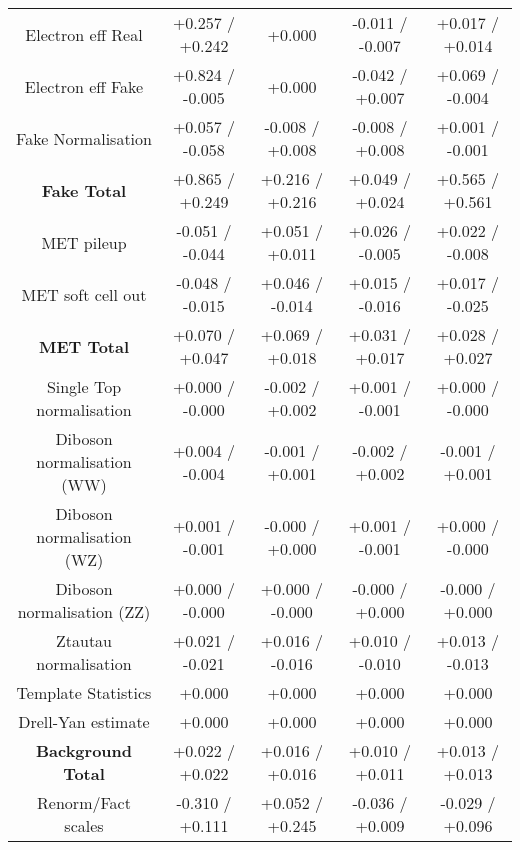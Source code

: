 \begin{table}[htbp]
\begin{center}
\begin{tabular}{|c|c|c|c|c|}
Electron eff Real                     &+0.257   / +0.242   & +0.000              & -0.011   / -0.007   & +0.017   / +0.014  \\
Electron eff Fake                     &+0.824   / -0.005   & +0.000              & -0.042   / +0.007   & +0.069   / -0.004  \\
Fake Normalisation                    &+0.057   / -0.058   & -0.008   / +0.008   & -0.008   / +0.008   & +0.001   / -0.001  \\
\hline
\textbf{Fake Total}                   &+0.865   / +0.249   & +0.216   / +0.216   & +0.049   / +0.024   & +0.565   / +0.561  \\
\hline
MET pileup                            &-0.051   / -0.044   & +0.051   / +0.011   & +0.026   / -0.005   & +0.022   / -0.008  \\
MET soft cell out                     &-0.048   / -0.015   & +0.046   / -0.014   & +0.015   / -0.016   & +0.017   / -0.025  \\
\hline
\textbf{MET Total}                    &+0.070   / +0.047   & +0.069   / +0.018   & +0.031   / +0.017   & +0.028   / +0.027  \\
\hline
Single Top normalisation              &+0.000   / -0.000   & -0.002   / +0.002   & +0.001   / -0.001   & +0.000   / -0.000  \\
Diboson normalisation (WW)            &+0.004   / -0.004   & -0.001   / +0.001   & -0.002   / +0.002   & -0.001   / +0.001  \\
Diboson normalisation (WZ)            &+0.001   / -0.001   & -0.000   / +0.000   & +0.001   / -0.001   & +0.000   / -0.000  \\
Diboson normalisation (ZZ)            &+0.000   / -0.000   & +0.000   / -0.000   & -0.000   / +0.000   & -0.000   / +0.000  \\
Ztautau normalisation                 &+0.021   / -0.021   & +0.016   / -0.016   & +0.010   / -0.010   & +0.013   / -0.013  \\
Template Statistics                   &+0.000              & +0.000              & +0.000              & +0.000             \\
Drell-Yan estimate                    &+0.000              & +0.000              & +0.000              & +0.000             \\
\hline
\textbf{Background Total}             &+0.022   / +0.022   & +0.016   / +0.016   & +0.010   / +0.011   & +0.013   / +0.013  \\
\hline
Renorm/Fact scales                    &-0.310   / +0.111   & +0.052   / +0.245   & -0.036   / +0.009   & -0.029   / +0.096  \\

\end{tabular}
\end{center}
\end{table}
